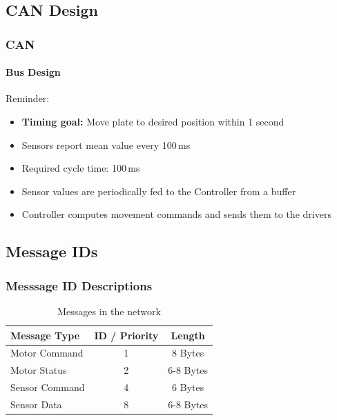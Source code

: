 \documentclass{beamer}
\begin{document}
\subsection{CAN Design}
\begin{frame}
  \frametitle{CAN}
  \framesubtitle{Bus Design}
	Reminder:
	\begin{itemize}
		\item \textbf{Timing goal:} Move plate to desired position within 1 second
		\item Sensors report mean value every 100\,ms
	\end{itemize}
	\vfill
  \begin{itemize}
    \item Required cycle time: 100\,ms
    \item Sensor values are periodically fed to the Controller from a buffer
    \item Controller computes movement commands and sends them to the drivers
  \end{itemize}
\end{frame}

\subsection{Message IDs}
\begin{frame}
  \frametitle{Messsage ID Descriptions}
  \begin{table}
\begin{tabular}{l | c | c }
Message Type & ID / Priority & Length \\
\hline \hline
Motor Command & 1 & 8 Bytes\\
Motor Status & 2 & 6-8 Bytes \\
Sensor Command & 4 & 6 Bytes \\
Sensor Data & 8 & 6-8 Bytes
\end{tabular}
\caption{Messages in the network}
\end{table}
\end{frame}
\end{document}
